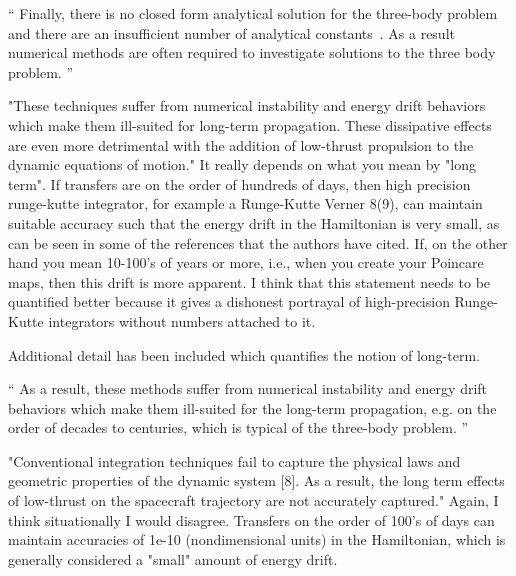 \documentclass[11pt]{article}
\newenvironment{correction}{\begin{list}{}{\setlength{\leftmargin}{1cm}\setlength{\rightmargin}{1cm}}\vspace{\parsep}\item[]``}{''\end{list}}
\begin{document}
\begin{enumerate}
\begin{correction}
Finally, there is no closed form analytical solution for the three-body problem and there are an insufficient number of analytical constants~\cite{szebehely1967}.
As a result numerical methods are often required to investigate solutions to the three body problem.
\end{correction}

\item 
    \begin{itshape}
"These techniques suffer from numerical instability and energy drift behaviors which make them ill-suited for long-term propagation. These dissipative effects are even more detrimental with the addition of low-thrust propulsion to the dynamic equations of motion."  It really depends on what you mean by "long term".  If transfers are on the order of hundreds of days, then high precision runge-kutte integrator, for example a Runge-Kutte Verner 8(9), can maintain suitable accuracy such that the energy drift in the Hamiltonian is very small, as can be seen in some of the references that the authors have cited.  If, on the other hand you mean 10-100's of years or more, i.e., when you create your Poincare maps, then this drift is more apparent.  I think that this statement needs to be quantified better because it gives a dishonest portrayal of high-precision Runge-Kutte integrators without numbers attached to it.
\end{itshape}

Additional detail has been included which quantifies the notion of long-term.

\begin{correction}
As a result, these methods suffer from numerical instability and energy drift behaviors which make them ill-suited for the long-term propagation, e.g. on the order of decades to centuries, which is typical of the three-body problem. 
\end{correction}

\item
    \begin{itshape}
"Conventional integration techniques fail to capture the physical laws and geometric properties of the dynamic system [8]. As a result, the long term effects of low-thrust on the spacecraft trajectory are not accurately captured."  Again, I think situationally I would disagree.  Transfers on the order of 100's of days can maintain accuracies of 1e-10 (nondimensional units) in the Hamiltonian, which is generally considered a "small" amount of energy drift.
\end{itshape}


\end{enumerate}
\end{document}
